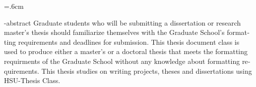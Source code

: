 
\baselineskip=.6cm
\begin{latin}
\en-abstract{
Graduate students who will be submitting a dissertation or research master’s thesis should familiarize themselves with the Graduate School’s formatting requirements and deadlines for submission.
This thesis document class is used to produce either a master's or a doctoral thesis that meets the formatting requirments of the Graduate School without any knowledge about formatting requirements.
This thesis studies on writing projects, theses and dissertations using HSU-Thesis Class. 
}
\label{LastPage}

\latinfirstPage
\end{latin}
